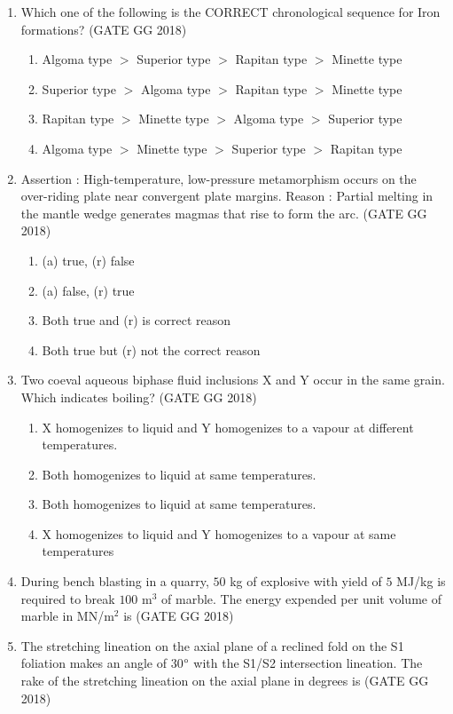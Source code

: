 \documentclass[journal]{IEEEtran}
\begin{document}
\begin{enumerate}[start=1]
\item Which one of the following is the CORRECT chronological sequence for Iron formations?  
\hfill(GATE GG 2018)
\begin{enumerate}
\item Algoma type $>$ Superior type $>$ Rapitan type $>$ Minette type
\item Superior type $>$ Algoma type $>$ Rapitan type $>$ Minette type
\item Rapitan type $>$ Minette type $>$ Algoma type $>$ Superior type
\item Algoma type $>$ Minette type $>$ Superior type $>$ Rapitan type
\end{enumerate}

\item Assertion : High-temperature, low-pressure metamorphism occurs on the over-riding plate near convergent plate margins.  
Reason : Partial melting in the mantle wedge generates magmas that rise to form the arc. 
\hfill(GATE GG 2018)
\begin{enumerate}
\item (a) true, (r) false
\item (a) false, (r) true
\item Both true and (r) is correct reason
\item Both true but (r) not the correct reason
\end{enumerate}

\item Two coeval aqueous biphase fluid inclusions X  and Y  occur in the same grain. Which indicates boiling?  
\hfill(GATE GG 2018)
\begin{enumerate}
\item X homogenizes to  liquid and Y homogenizes to a vapour at different temperatures.
\item Both homogenizes to  liquid at same temperatures.
\item Both homogenizes to  liquid at same temperatures.
\item X homogenizes to  liquid and Y homogenizes to a vapour at same  temperatures
\end{enumerate}
\vspace{0.7cm}
\item During bench blasting in a quarry, $50$ kg of explosive with yield of $5$ MJ/kg is required to break $100$ m$^3$ of marble. The energy expended per unit volume of marble in MN/m$^2$ is \makebox[2cm]{\hrulefill}
\hfill(GATE GG 2018)
\vspace{0.5cm}
\item The stretching lineation on the axial plane  of a reclined fold on the S1 foliation makes an angle of 30$\degree$ with the S1/S2 intersection lineation.  The rake of the stretching lineation on the axial plane in degrees is \makebox[2cm]{\hrulefill}
\hfill(GATE GG 2018)
\vspace{0.5cm}


\end{enumerate}
\end{document}
